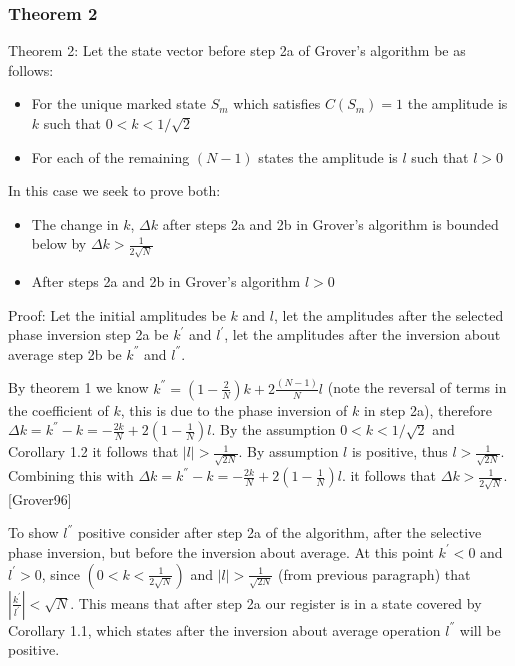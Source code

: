 \documentclass[]{article}
\begin{document}
\subsubsection{Theorem 2}
	
Theorem 2: Let the state vector before step 2a of Grover's algorithm
be as follows:
\begin{itemize}
\item For the unique marked state $S_{m}$ which satisfies $C(S_{m}) = 1$ the amplitude is $k$ such that $0 < k < 1/\sqrt{2}$

\item For each of the remaining $(N-1)$ states the amplitude is $l$ such that $l > 0$
\end{itemize}
In this case we seek to prove both:
\begin{itemize}
\item The change in $k$, $\Delta k$ after steps 2a and 2b in Grover's algorithm is bounded below by $\Delta k > \frac{1}{2\sqrt{N}}$
\item After steps 2a and 2b in Grover's algorithm $l > 0$
\end{itemize}

Proof: Let the initial amplitudes be $k$ and $l$, let the amplitudes
after the selected phase inversion step 2a be $k^{'}$ and $l^{'}$, let
the amplitudes after the inversion about average step 2b be $k^{''}$
and $l^{''}$.
	
By theorem 1 we know $k^{''} = \left(1-\frac{2}{N} \right)k +
2\frac{(N-1)}{N}l$ (note the reversal of terms in the coefficient of
$k$, this is due to the phase inversion of $k$ in step 2a), therefore
$\Delta k = k^{''} - k = -\frac{2k}{N} + 2\left(1-\frac{1}{N}\right)l$.  
By the assumption $0 < k < 1/\sqrt{2} $ and Corollary 1.2 it follows
that $|l| > \frac{1}{\sqrt{2N}}$.  By assumption $l$ is positive, thus
$l > \frac{1}{\sqrt{2N}}$.  Combining this with $\Delta k = k^{''} - k
= -\frac{2k}{N} + 2\left(1-\frac{1}{N}\right)l$. it follows that
$\Delta k > \frac{1}{2\sqrt{N}}$. [Grover96]

To show $l^{''}$ positive consider after step 2a of the algorithm,
after the selective phase inversion, but before the inversion about
average. At this point $k^{'} < 0$ and $l^{'} > 0$, since $\left(0 < k
< \frac{1}{2\sqrt{N}} \right)$ and $|l| > \frac{1}{\sqrt{2N}}$ (from
previous paragraph) that $\left|\frac{k^{'}}{l^{'}}\right|< \sqrt{N}$.
This means that after step 2a our register is in a state covered by
Corollary 1.1, which states after the inversion about average
operation $l^{''}$ will be positive.
\end{document}
